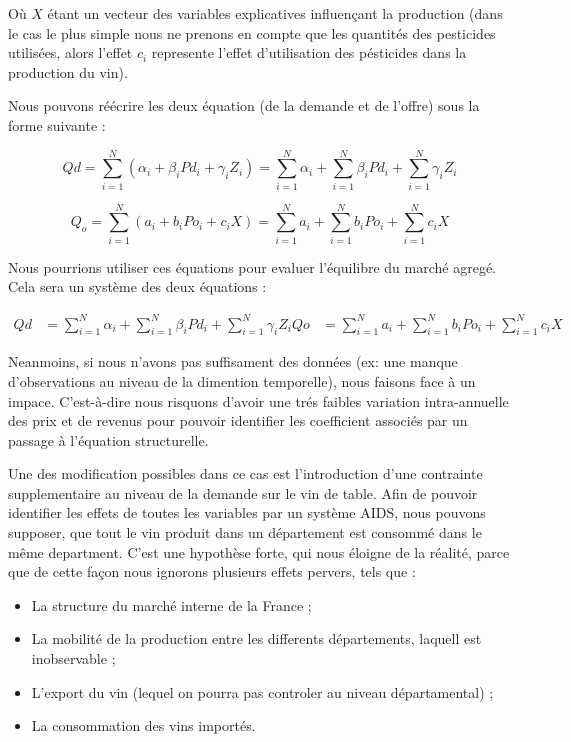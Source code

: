 \documentclass[11pt,]{article}
\providecommand{\tightlist}{%
  \setlength{\itemsep}{0pt}\setlength{\parskip}{0pt}}
\begin{document}
Où \(X\) étant un vecteur des variables explicatives influençant la
production (dans le cas le plus simple nous ne prenons en compte que les
quantités des pesticides utilisées, alors l'effet \(c_i\) represente
l'effet d'utilisation des pésticides dans la production du vin).

Nous pouvons réécrire les deux équation (de la demande et de l'offre)
sous la forme suivante :

\begin{equation}
    Qd = \sum_{i = 1}^{N} ( \alpha_i + \beta_i Pd_i + \gamma_i Z_i ) = \sum_{i = 1}^{N} \alpha_i + \sum_{i = 1}^{N} \beta_i Pd_i + \sum_{i = 1}^{N} \gamma_i Z_i
\end{equation}

\begin{equation}
    Q_o = \sum_{i = 1}^{N} (a_i + b_i Po_i + c_i X) = \sum_{i = 1}^{N} a_i + \sum_{i = 1}^{N} b_i Po_i + \sum_{i = 1}^{N} c_i X
\end{equation}

Nous pourrions utiliser ces équations pour evaluer l'équilibre du marché
agregé. Cela sera un système des deux équations :

\begin{align*}
    Qd & = \sum_{i = 1}^{N} \alpha_i + \sum_{i = 1}^{N} \beta_i Pd_i + \sum_{i = 1}^{N} \gamma_i Z_i
    Qo & = \sum_{i = 1}^{N} a_i + \sum_{i = 1}^{N} b_i Po_i + \sum_{i = 1}^{N} c_i X
\end{align*}

Neanmoins, si nous n'avons pas suffisament des données (ex: une manque
d'observations au niveau de la dimention temporelle), nous faisons face
à un impace. C'est-à-dire nous risquons d'avoir une trés faibles
variation intra-annuelle des prix et de revenus pour pouvoir identifier
les coefficient associés par un passage à l'équation structurelle.

Une des modification possibles dans ce cas est l'introduction d'une
contrainte supplementaire au niveau de la demande sur le vin de table.
Afin de pouvoir identifier les effets de toutes les variables par un
système AIDS, nous pouvons supposer, que tout le vin produit dans un
département est consommé dans le même department. C'est une hypothèse
forte, qui nous éloigne de la réalité, parce que de cette façon nous
ignorons plusieurs effets pervers, tels que :

\begin{itemize}
\tightlist
\item
  La structure du marché interne de la France ;
\item
  La mobilité de la production entre les differents départements,
  laquell est inobservable ;
\item
  L'export du vin (lequel on pourra pas controler au niveau
  départamental) ;
\item
  La consommation des vins importés.
\end{itemize}
\end{document}
